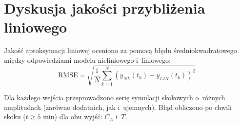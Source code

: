 \documentclass[a4paper,12pt]{article}
\begin{document}




\newpage
\section{Dyskusja jakości przybliżenia liniowego}


Jakość aproksymacji liniowej oceniono za pomocą błędu średniokwadratowego między odpowiedziami modelu nieliniowego i~liniowego:
\begin{equation}
    \text{RMSE} = \sqrt{\frac{1}{N} \sum_{k=1}^{N} \left( y_{NL}(t_k) - y_{LIN}(t_k) \right)^2}
\end{equation}

Dla każdego wejścia przeprowadzono serię symulacji skokowych o~różnych amplitudach (zarówno dodatnich, jak i~ujemnych). Błąd obliczono po chwili skoku ($t \geq 5$ min) dla obu wyjść: $C_A$ i~$T$.

\end{document}
